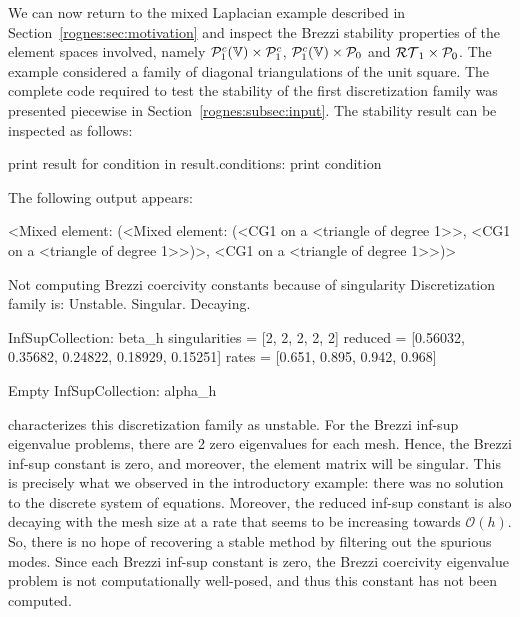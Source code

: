 We can now return to the mixed Laplacian example described in
Section~\ref{rognes:sec:motivation} and inspect the Brezzi stability
properties of the element spaces involved, namely $\mathcal{P}^c_1(\mathbb{V})
\times \mathcal{P}^c_1$, $\mathcal{P}^c_1(\mathbb{V}) \times \mathcal{P}_0$ and $\mathcal{RT}_1
\times \mathcal{P}_0$. The example considered a family of diagonal
triangulations of the unit square. The complete code required to test
the stability of the first discretization family was presented
piecewise in Section~\ref{rognes:subsec:input}. The stability result
can be inspected as follows:
\begin{python}
print result
for condition in result.conditions:
    print condition
\end{python}
The following output appears:
\begin{python}
<Mixed element: (<Mixed element: (<CG1 on a <triangle of degree 1>>,
<CG1 on a <triangle of degree 1>>)>, <CG1 on a <triangle of degree 1>>)>

Not computing Brezzi coercivity constants because of singularity
Discretization family is: Unstable. Singular. Decaying.

InfSupCollection: beta_h
singularities =  [2, 2, 2, 2, 2]
reduced =        [0.56032, 0.35682, 0.24822, 0.18929, 0.15251]
rates  =         [0.651, 0.895, 0.942, 0.968]

Empty InfSupCollection: alpha_h
\end{python}
\ascot{} characterizes this discretization family as unstable. For the
Brezzi inf-sup eigenvalue problems, there are 2 zero eigenvalues for
each mesh. Hence, the Brezzi inf-sup constant is zero, and moreover,
the element matrix will be singular. This is precisely what we
observed in the introductory example: there was no solution to the
discrete system of equations. Moreover, the reduced inf-sup constant
is also decaying with the mesh size at a rate that seems to be
increasing towards $\mathcal{O}(h)$. So, there is no hope of
recovering a stable method by filtering out the spurious modes. Since
each Brezzi inf-sup constant is zero, the Brezzi coercivity eigenvalue
problem is not computationally well-posed, and thus this constant has
not been computed.

